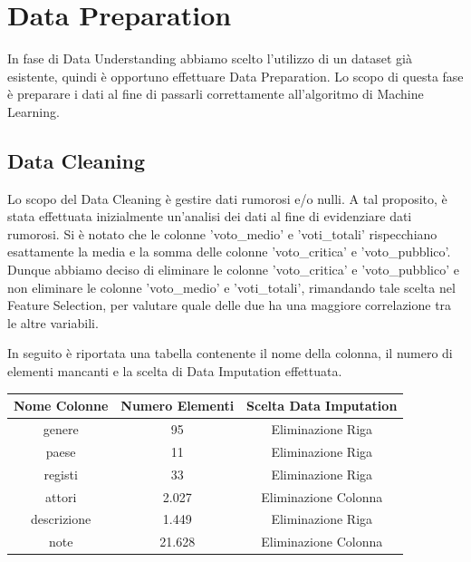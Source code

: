\documentclass[a4paper, 10pt]{report}
\begin{document}
    \chapter{Data Preparation}\label{ch:data-preparation}
        In fase di Data Understanding abbiamo scelto l'utilizzo di un dataset già esistente, quindi è opportuno effettuare Data Preparation.
        Lo scopo di questa fase è preparare i dati al fine di passarli correttamente all'algoritmo di Machine Learning.

        \section{Data Cleaning}\label{sec:data-cleaning}
            Lo scopo del Data Cleaning è gestire dati rumorosi e/o nulli.
            A tal proposito, è stata effettuata inizialmente un'analisi dei dati al fine di evidenziare dati rumorosi.
            Si è notato che le colonne 'voto\_medio' e 'voti\_totali' rispecchiano esattamente la media e la somma delle colonne
            'voto\_critica' e 'voto\_pubblico'. Dunque abbiamo deciso di eliminare le colonne 'voto\_critica' e 'voto\_pubblico' e
            non eliminare le colonne 'voto\_medio' e 'voti\_totali', rimandando tale scelta nel Feature Selection, per valutare
            quale delle due ha una maggiore correlazione tra le altre variabili.

            In seguito è riportata una tabella contenente il nome della colonna, il numero di elementi mancanti e la scelta di
            Data Imputation effettuata.\\

            \begin{center}
                \begin{tabular}{ |c|c|c| }
                    \hline \rowcolor{Goldenrod} Nome Colonne & Numero Elementi & Scelta Data Imputation \\
                    \hline genere & 95 & Eliminazione Riga \\
                    \hline paese & 11 & Eliminazione Riga \\
                    \hline registi & 33 & Eliminazione Riga \\
                    \hline attori & 2.027 & Eliminazione Colonna \\
                    \hline descrizione & 1.449 & Eliminazione Riga \\
                    \hline note & 21.628 & Eliminazione Colonna \\
                    \hline
                \end{tabular}
                \\
            \end{center}
\end{document}
